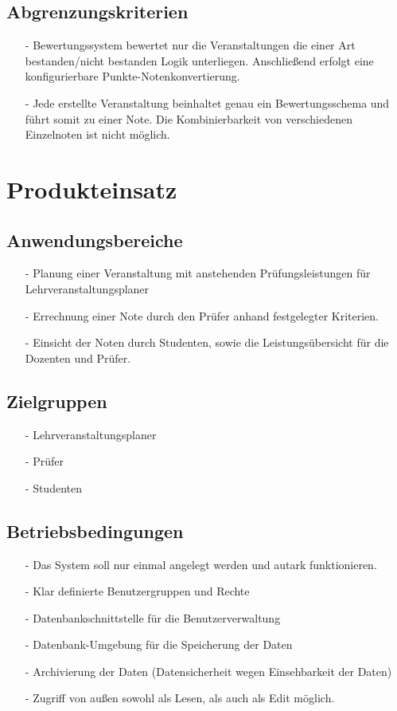 		\subsection{Abgrenzungskriterien}
		\begin{itemize}
		\item[-]	Bewertungssystem bewertet nur die Veranstaltungen die einer Art bestanden/nicht bestanden Logik unterliegen. Anschließend erfolgt eine konfigurierbare Punkte-Notenkonvertierung.
		\item[-]	Jede erstellte Veranstaltung beinhaltet genau ein Bewertungsschema und führt somit zu einer Note. Die Kombinierbarkeit von verschiedenen Einzelnoten ist nicht möglich.
		\end{itemize}
		
	\section{Produkteinsatz}
	
		
		\subsection{Anwendungsbereiche}
		\begin{itemize}
		\item[-]	Planung einer Veranstaltung mit anstehenden Prüfungsleistungen für Lehrveranstaltungsplaner
		\item[-]	Errechnung einer Note durch den Prüfer anhand festgelegter Kriterien.
		\item[-]	Einsicht der Noten durch Studenten, sowie die Leistungsübersicht für die Dozenten und Prüfer.
		\end{itemize}
		
		
		\subsection{Zielgruppen}
		\begin{itemize}
		\item[-]	Lehrveranstaltungsplaner
		\item[-]	Prüfer
		\item[-]	Studenten
		\end{itemize}

		\subsection{Betriebsbedingungen}
		\begin{itemize}
		\item[-]	Das System soll nur einmal angelegt werden und autark funktionieren.
		\item[-]	Klar definierte Benutzergruppen und Rechte
		\item[-]	Datenbankschnittstelle für die Benutzerverwaltung
		\item[-]	Datenbank-Umgebung für die Speicherung der Daten
		\item[-]	Archivierung der Daten (Datensicherheit wegen Einsehbarkeit der Daten)
		\item[-]	Zugriff von außen sowohl als Lesen, als auch als Edit möglich. 
		\end{itemize}

